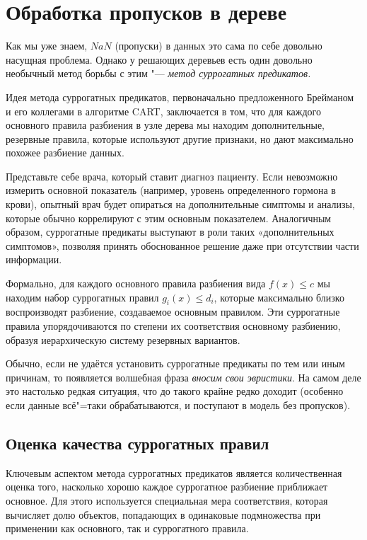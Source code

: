 \section{Обработка пропусков в дереве}

Как мы уже знаем, $NaN$ (пропуски) в данных это сама по себе довольно насущная проблема. Однако у решающих деревьев есть один довольно необычный метод борьбы с этим "--- \textit{метод суррогатных предикатов.}

Идея метода суррогатных предикатов, первоначально предложенного Брейманом и его коллегами в алгоритме CART, заключается в том, что для каждого основного правила разбиения в узле дерева мы находим дополнительные, резервные правила, которые используют другие признаки, но дают максимально похожее разбиение данных.

Представьте себе врача, который ставит диагноз пациенту. Если невозможно измерить основной показатель (например, уровень определенного гормона в крови), опытный врач будет опираться на дополнительные симптомы и анализы, которые обычно коррелируют с этим основным показателем. Аналогичным образом, суррогатные предикаты выступают в роли таких «дополнительных симптомов», позволяя принять обоснованное решение даже при отсутствии части информации.

Формально, для каждого основного правила разбиения вида $f(x) \leq c$ мы находим набор суррогатных правил $g_i(x) \leq d_i$, которые максимально близко воспроизводят разбиение, создаваемое основным правилом. Эти суррогатные правила упорядочиваются по степени их соответствия основному разбиению, образуя иерархическую систему резервных вариантов.

Обычно, если не удаётся установить суррогатные предикаты по тем или иным причинам, то появляется волшебная фраза \textit{вносим свои эвристики}. На самом деле это настолько редкая ситуация, что до такого крайне редко доходит (особенно если данные всё"=таки обрабатываются, и поступают в модель без пропусков).

\subsection{Оценка качества суррогатных правил}

Ключевым аспектом метода суррогатных предикатов является количественная оценка того, насколько хорошо каждое суррогатное разбиение приближает основное. Для этого используется специальная мера соответствия, которая вычисляет долю объектов, попадающих в одинаковые подмножества при применении как основного, так и суррогатного правила.

